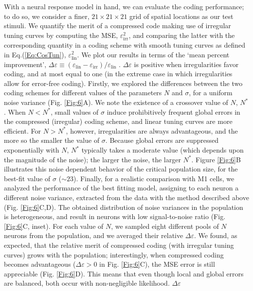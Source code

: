 \documentclass[a4paper]{article}%
\begin{document}
With a neural response model in
hand, we can evaluate the coding performance; to do so, we consider a finer,
$21\times21\times21$ grid of spatial locations as our test stimuli. We
quantify the merit of a compressed code making use of irregular tuning curves
by computing the MSE, $\varepsilon_{\text{irr}}^{2}$, and comparing the latter
with the corresponding quantity in a coding scheme with smooth tuning curves
as defined in Eq.(\ref{Eq:CosTun}), $\varepsilon_{\text{lin}}^{2}$. We plot
our results in terms of the `mean percent improvement', $\Delta\varepsilon
\equiv\left(  \varepsilon_{\text{lin}}-\varepsilon_{\text{irr}}\right)
/\varepsilon_{\text{lin}}$ . $\Delta\varepsilon$ is positive when
irregularities favor coding, and at most equal to one (in the extreme case in
which irregularities allow for error-free coding). Firstly, we explored the differences between the two coding schemes for different values of the parameters $N$ and $\sigma$, for a uniform noise variance (Fig. \ref{Fig:6}A).
We note the
existence of a crossover value of $N$, $N^{\ast}$. When $N<N^{\ast}$, small
values of $\sigma$ induce prohibitively frequent global errors in the
compressed (irregular) coding scheme, and linear tuning curves are more
efficient. For $N>N^{\ast}$, however, irregularities are always advantageous,
and the more so the smaller the value of $\sigma$. Because global errors are
suppressed exponentially with $N$, $N^{\ast}$ typically takes a moderate value
(which depends upon the magnitude of the noise); the larger the noise, the
larger $N^{\ast}$. Figure \ref{Fig:6}B  illustrates this noise dependent behavior of the critical population size, for the best-fit value of $\sigma$ ($\sim 23$).
Finally, for a realistic comparison with M1 cells, we analyzed the performance of the best fitting model, assigning to each neuron a different noise variance, extracted from the data with the method described above (Fig. \ref{Fig:6}C,D).
The obtained distribution of noise variances in the population is heterogeneous, and result in neurons with low signal-to-noise ratio (Fig.
\ref{Fig:6}C, inset). For each value of $N$, we sampled eight different pools
of $N$ neurons from the population, and we averaged their relative $\Delta\varepsilon$. We found, as expected, that the relative merit of
compressed coding (with irregular tuning curves) grows with the population;
interestingly, when compressed coding becomes advantageous ($\Delta
\varepsilon>0$ in Fig. \ref{Fig:6}C), the MSE error is still appreciable (Fig. \ref{Fig:6}D). This means that even though local and global errors
are balanced, both occur with non-negligible likelihood. $\Delta\varepsilon$
\end{document}
